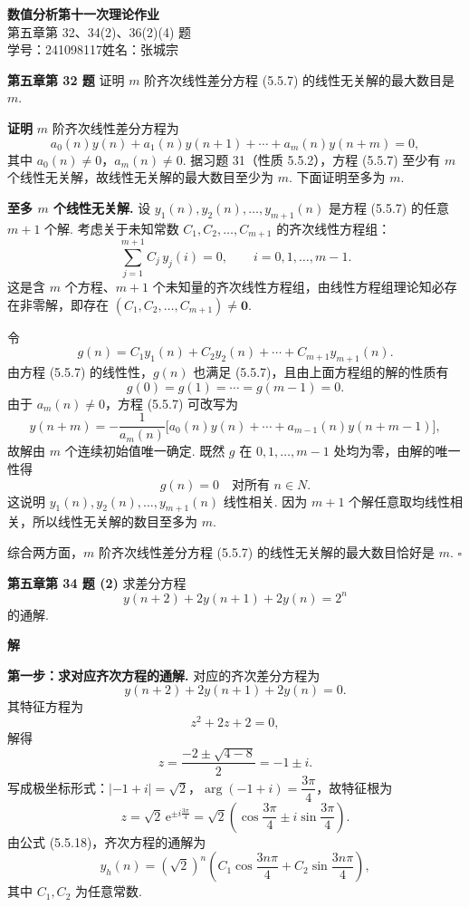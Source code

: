\documentclass[UTF8,a4paper,11pt]{ctexart}
\newcommand{\ee}{\mathrm{e}}
\newcommand{\QED}{\hfill$\square$}
\begin{document}
\begin{center}
  {\LARGE\bfseries 数值分析\quad 第十一次理论作业}\\[6pt]
  {\large 第五章第 32、34(2)、36(2)(4) 题}\\[4pt]
  {\normalsize 学号：241098117\quad 姓名：张城宗}
\end{center}

\bigskip

\noindent\textbf{第五章\quad 第 32 题}\quad
证明 $m$ 阶齐次线性差分方程 (5.5.7) 的线性无关解的最大数目是 $m$.

\medskip
\noindent\textbf{证明}\quad
$m$ 阶齐次线性差分方程为
\[
  a_0(n)y(n)+a_1(n)y(n+1)+\cdots+a_m(n)y(n+m)=0,
  \tag{5.5.7}
\]
其中 $a_0(n)\neq 0$，$a_m(n)\neq 0$. 据习题 31（性质 5.5.2），方程 (5.5.7) 至少有 $m$ 个线性无关解，故线性无关解的最大数目至少为 $m$. 下面证明至多为 $m$.

\textbf{至多 $m$ 个线性无关解.}\quad
设 $y_1(n),y_2(n),\ldots,y_{m+1}(n)$ 是方程 (5.5.7) 的任意 $m+1$ 个解. 考虑关于未知常数 $C_1,C_2,\ldots,C_{m+1}$ 的齐次线性方程组：
\[
  \sum_{j=1}^{m+1} C_j\, y_j(i)=0,\qquad i=0,1,\ldots,m-1.
\]
这是含 $m$ 个方程、$m+1$ 个未知量的齐次线性方程组，由线性方程组理论知必存在非零解，即存在
$(C_1,C_2,\ldots,C_{m+1})\neq\mathbf{0}$.

令
\[
  g(n)=C_1 y_1(n)+C_2 y_2(n)+\cdots+C_{m+1}y_{m+1}(n).
\]
由方程 (5.5.7) 的线性性，$g(n)$ 也满足 (5.5.7)，且由上面方程组的解的性质有
\[
  g(0)=g(1)=\cdots=g(m-1)=0.
\]
由于 $a_m(n)\neq 0$，方程 (5.5.7) 可改写为
\[
  y(n+m)=-\frac{1}{a_m(n)}\bigl[a_0(n)y(n)+\cdots+a_{m-1}(n)y(n+m-1)\bigr],
\]
故解由 $m$ 个连续初始值唯一确定. 既然 $g$ 在 $0,1,\ldots,m-1$ 处均为零，由解的唯一性得
\[
  g(n)=0 \quad \text{对所有 } n\in N.
\]
这说明 $y_1(n),y_2(n),\ldots,y_{m+1}(n)$ 线性相关. 因为 $m+1$ 个解任意取均线性相关，所以线性无关解的数目至多为 $m$.

综合两方面，$m$ 阶齐次线性差分方程 (5.5.7) 的线性无关解的最大数目恰好是 $m$. \QED

\bigskip\bigskip

\noindent\textbf{第五章\quad 第 34 题 (2)}\quad
求差分方程
\[
  y(n+2)+2y(n+1)+2y(n)=2^n
\]
的通解.

\medskip
\noindent\textbf{解}

\textbf{第一步：求对应齐次方程的通解.}\quad
对应的齐次差分方程为
\[
  y(n+2)+2y(n+1)+2y(n)=0.
\]
其特征方程为
\[
  z^2+2z+2=0,
\]
解得
\[
  z=\frac{-2\pm\sqrt{4-8}}{2}=-1\pm i.
\]
写成极坐标形式：$|-1+i|=\sqrt{2}$，$\arg(-1+i)=\dfrac{3\pi}{4}$，故特征根为
\[
  z=\sqrt{2}\,\ee^{\pm i\frac{3\pi}{4}}=\sqrt{2}\!\left(\cos\frac{3\pi}{4}\pm i\sin\frac{3\pi}{4}\right).
\]
由公式 (5.5.18)，齐次方程的通解为
\[
  y_h(n)=(\sqrt{2})^n\!\left(C_1\cos\frac{3n\pi}{4}+C_2\sin\frac{3n\pi}{4}\right),
\]
其中 $C_1,C_2$ 为任意常数.
\end{document}
